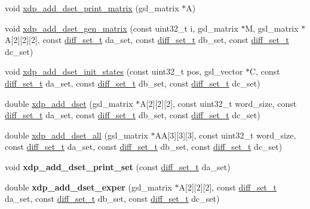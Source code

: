 \begin{DoxyCompactItemize}
void \hyperlink{xdp-add-diff-set_8hh_a9b7e890683b9052bfda8135b105c88b9}{xdp\-\_\-add\-\_\-dset\-\_\-print\-\_\-matrix} (gsl\-\_\-matrix $\ast$\-A)
\item 
void \hyperlink{xdp-add-diff-set_8hh_abd7268d57bd7172e01c396f999db8360}{xdp\-\_\-add\-\_\-dset\-\_\-gen\-\_\-matrix} (const uint32\-\_\-t i, gsl\-\_\-matrix $\ast$\-M, gsl\-\_\-matrix $\ast$\-A\mbox{[}2\mbox{]}\mbox{[}2\mbox{]}\mbox{[}2\mbox{]}, const \hyperlink{structdiff__set__t}{diff\-\_\-set\-\_\-t} da\-\_\-set, const \hyperlink{structdiff__set__t}{diff\-\_\-set\-\_\-t} db\-\_\-set, const \hyperlink{structdiff__set__t}{diff\-\_\-set\-\_\-t} dc\-\_\-set)
\item 
void \hyperlink{xdp-add-diff-set_8hh_a3be5af7d04a65417579b2f23542d1916}{xdp\-\_\-add\-\_\-dset\-\_\-init\-\_\-states} (const uint32\-\_\-t pos, gsl\-\_\-vector $\ast$\-C, const \hyperlink{structdiff__set__t}{diff\-\_\-set\-\_\-t} da\-\_\-set, const \hyperlink{structdiff__set__t}{diff\-\_\-set\-\_\-t} db\-\_\-set, const \hyperlink{structdiff__set__t}{diff\-\_\-set\-\_\-t} dc\-\_\-set)
\item 
double \hyperlink{xdp-add-diff-set_8hh_aad57cdbd50f995cbb7a6c23528f12f67}{xdp\-\_\-add\-\_\-dset} (gsl\-\_\-matrix $\ast$\-A\mbox{[}2\mbox{]}\mbox{[}2\mbox{]}\mbox{[}2\mbox{]}, const uint32\-\_\-t word\-\_\-size, const \hyperlink{structdiff__set__t}{diff\-\_\-set\-\_\-t} da\-\_\-set, const \hyperlink{structdiff__set__t}{diff\-\_\-set\-\_\-t} db\-\_\-set, const \hyperlink{structdiff__set__t}{diff\-\_\-set\-\_\-t} dc\-\_\-set)
\item 
double \hyperlink{xdp-add-diff-set_8hh_a2a0df79e63c1cb80d2508ba605bbd2b3}{xdp\-\_\-add\-\_\-dset\-\_\-all} (gsl\-\_\-matrix $\ast$\-A\-A\mbox{[}3\mbox{]}\mbox{[}3\mbox{]}\mbox{[}3\mbox{]}, const uint32\-\_\-t word\-\_\-size, const \hyperlink{structdiff__set__t}{diff\-\_\-set\-\_\-t} da\-\_\-set, const \hyperlink{structdiff__set__t}{diff\-\_\-set\-\_\-t} db\-\_\-set, const \hyperlink{structdiff__set__t}{diff\-\_\-set\-\_\-t} dc\-\_\-set)
\item 
\hypertarget{xdp-add-diff-set_8hh_af9045051618f2fe9d38e517be1a2601a}{void {\bfseries xdp\-\_\-add\-\_\-dset\-\_\-print\-\_\-set} (const \hyperlink{structdiff__set__t}{diff\-\_\-set\-\_\-t} da\-\_\-set)}\label{xdp-add-diff-set_8hh_af9045051618f2fe9d38e517be1a2601a}

\item 
\hypertarget{xdp-add-diff-set_8hh_a52f7ccb7ba4d5a4fbb5b6e6c40d3e467}{double {\bfseries xdp\-\_\-add\-\_\-dset\-\_\-exper} (gsl\-\_\-matrix $\ast$\-A\mbox{[}2\mbox{]}\mbox{[}2\mbox{]}\mbox{[}2\mbox{]}, const \hyperlink{structdiff__set__t}{diff\-\_\-set\-\_\-t} da\-\_\-set, const \hyperlink{structdiff__set__t}{diff\-\_\-set\-\_\-t} db\-\_\-set, const \hyperlink{structdiff__set__t}{diff\-\_\-set\-\_\-t} dc\-\_\-set)}\label{xdp-add-diff-set_8hh_a52f7ccb7ba4d5a4fbb5b6e6c40d3e467}


\end{DoxyCompactItemize}
